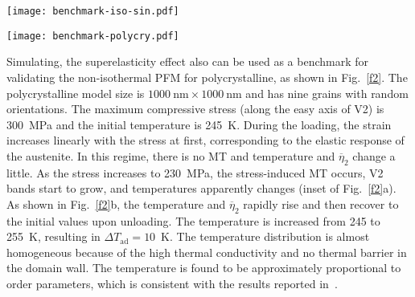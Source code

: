 \documentclass[reprint,3p,sort&compress,times,onecolumn]{elsarticle}
\begin{document}
\begin{figure*}[!t]
\centering
  \texttt{[image: benchmark-iso-sin.pdf]}
  \caption{Temporal evolution of order parameters under (a) stress-induced MT and (b) temperature-induced MT. (c) The stress-strain curve of single crystal upon stress loading and unloading at $T=275$~K (above $T_0$). Blue and red are austenite (A) and V2, respectively.} \label{f1}
\end{figure*}
\begin{figure*}[!t]
\centering
  \texttt{[image: benchmark-polycry.pdf]}
  \caption{(a) The stress-strain response of polycrystal under $T=245$~K and $\sigma=300$~MPa. Blue and red colors represent A and V2, respectively. (b) Temporal evolution of temperature and $\overline{\eta_I}$.} \label{f2}
\end{figure*}


Simulating, the superelasticity effect also can be used as a benchmark for validating the non-isothermal PFM for polycrystalline, as shown in Fig.~\ref{f2}. The polycrystalline model size is $1000~\text{nm} \times 1000~\text{nm}$ and has nine grains with random orientations. The maximum compressive stress (along the easy axis of V2) is 300~MPa and the initial temperature is 245~K.
During the loading, the strain increases linearly with the stress at first, corresponding to the elastic response of the austenite. In this regime, there is no MT and temperature and $\overline{\eta}_2$ change a little. As the stress increases to 230~MPa, the stress-induced MT occurs, V2 bands start to grow, and temperatures apparently changes (inset of Fig.~\ref{f2}a).
As shown in Fig.~\ref{f2}b, the temperature and $\overline{\eta}_2$ rapidly rise and then recover to the initial values upon unloading.
The temperature is increased from 245 to 255~K, resulting in $\Delta T_{\text{ad}}=10$~K. The temperature distribution is almost homogeneous because of the high thermal conductivity and no thermal barrier in the domain wall. The temperature is found to be approximately proportional to order parameters, which is consistent with the results reported in~\cite{cui2017three}.
\end{document}
